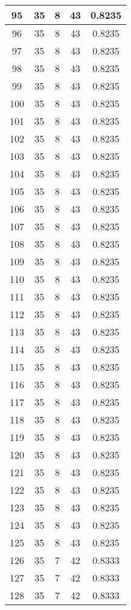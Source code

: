 \documentclass[letterpaper, 12pt]{article}
\begin{document}
\begin{longtable}{|c|c|c|c|c|}
95 & 35 & 8 & 43 & 0.8235 \\
\hline
96 & 35 & 8 & 43 & 0.8235 \\
\hline
97 & 35 & 8 & 43 & 0.8235 \\
\hline
98 & 35 & 8 & 43 & 0.8235 \\
\hline
99 & 35 & 8 & 43 & 0.8235 \\
\hline
100 & 35 & 8 & 43 & 0.8235 \\
\hline
101 & 35 & 8 & 43 & 0.8235 \\
\hline
102 & 35 & 8 & 43 & 0.8235 \\
\hline
103 & 35 & 8 & 43 & 0.8235 \\
\hline
104 & 35 & 8 & 43 & 0.8235 \\
\hline
105 & 35 & 8 & 43 & 0.8235 \\
\hline
106 & 35 & 8 & 43 & 0.8235 \\
\hline
107 & 35 & 8 & 43 & 0.8235 \\
\hline
108 & 35 & 8 & 43 & 0.8235 \\
\hline
109 & 35 & 8 & 43 & 0.8235 \\
\hline
110 & 35 & 8 & 43 & 0.8235 \\
\hline
111 & 35 & 8 & 43 & 0.8235 \\
\hline
112 & 35 & 8 & 43 & 0.8235 \\
\hline
113 & 35 & 8 & 43 & 0.8235 \\
\hline
114 & 35 & 8 & 43 & 0.8235 \\
\hline
115 & 35 & 8 & 43 & 0.8235 \\
\hline
116 & 35 & 8 & 43 & 0.8235 \\
\hline
117 & 35 & 8 & 43 & 0.8235 \\
\hline
118 & 35 & 8 & 43 & 0.8235 \\
\hline
119 & 35 & 8 & 43 & 0.8235 \\
\hline
120 & 35 & 8 & 43 & 0.8235 \\
\hline
121 & 35 & 8 & 43 & 0.8235 \\
\hline
122 & 35 & 8 & 43 & 0.8235 \\
\hline
123 & 35 & 8 & 43 & 0.8235 \\
\hline
124 & 35 & 8 & 43 & 0.8235 \\
\hline
125 & 35 & 8 & 43 & 0.8235 \\
\hline
126 & 35 & 7 & 42 & 0.8333 \\
\hline
127 & 35 & 7 & 42 & 0.8333 \\
\hline
128 & 35 & 7 & 42 & 0.8333 \\

\end{longtable}
\end{document}
